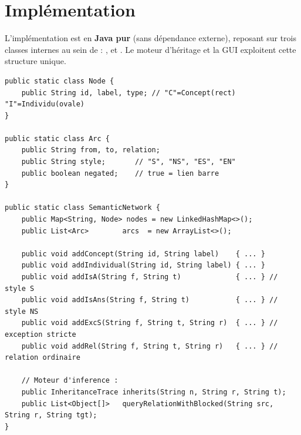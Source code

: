 \section{Implémentation}

L'implémentation est en \textbf{Java pur} (sans dépendance externe), reposant
sur trois classes internes au sein de  :
,  et .
Le moteur d'héritage et la GUI exploitent cette structure unique.

\begin{lstlisting}[caption={Structures de base du réseau sémantique}]
public static class Node {
    public String id, label, type; // "C"=Concept(rect)  "I"=Individu(ovale)
}

public static class Arc {
    public String from, to, relation;
    public String style;       // "S", "NS", "ES", "EN"
    public boolean negated;    // true = lien barre
}

public static class SemanticNetwork {
    public Map<String, Node> nodes = new LinkedHashMap<>();
    public List<Arc>        arcs  = new ArrayList<>();

    public void addConcept(String id, String label)    { ... }
    public void addIndividual(String id, String label) { ... }
    public void addIsA(String f, String t)             { ... } // style S
    public void addIsAns(String f, String t)           { ... } // style NS
    public void addExcS(String f, String t, String r)  { ... } // exception stricte
    public void addRel(String f, String t, String r)   { ... } // relation ordinaire

    // Moteur d'inference :
    public InheritanceTrace inherits(String n, String r, String t);
    public List<Object[]>   queryRelationWithBlocked(String src, String r, String tgt);
}
\end{lstlisting}
